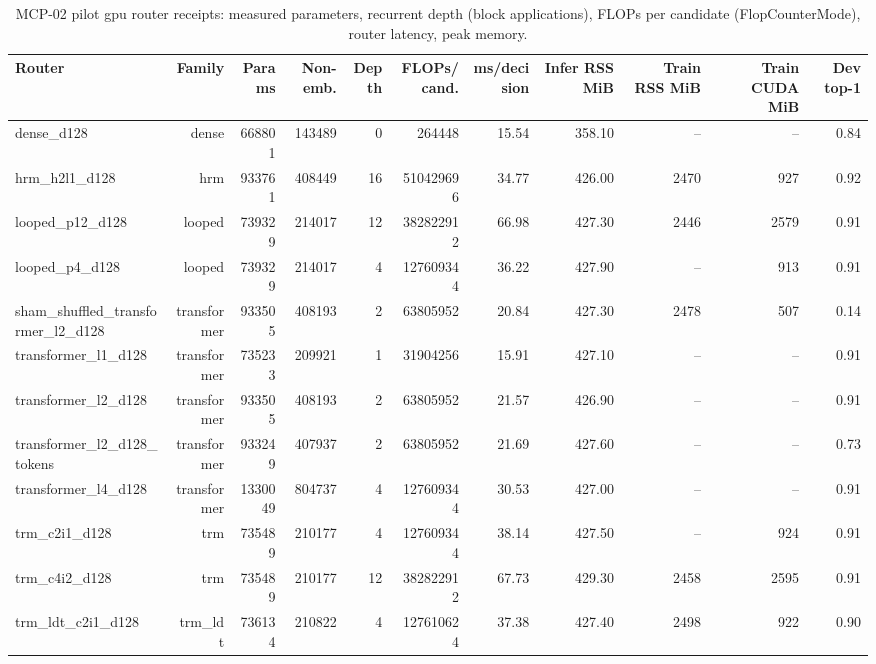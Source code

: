 \begin{table}[t]
\centering
\small
\begin{adjustbox}{max width=\linewidth}
\begin{tabular}{lrrrrrrrrrr}
\toprule
Router & Family & Params & Non-emb. & Depth & FLOPs/cand. & ms/decision & Infer RSS MiB & Train RSS MiB & Train CUDA MiB & Dev top-1 \\
\midrule
dense\_d128 & dense & 668801 & 143489 & 0 & 264448 & 15.54 & 358.10 & -- & -- & 0.84 \\
hrm\_h2l1\_d128 & hrm & 933761 & 408449 & 16 & 510429696 & 34.77 & 426.00 & 2470 & 927 & 0.92 \\
looped\_p12\_d128 & looped & 739329 & 214017 & 12 & 382822912 & 66.98 & 427.30 & 2446 & 2579 & 0.91 \\
looped\_p4\_d128 & looped & 739329 & 214017 & 4 & 127609344 & 36.22 & 427.90 & -- & 913 & 0.91 \\
sham\_shuffled\_transformer\_l2\_d128 & transformer & 933505 & 408193 & 2 & 63805952 & 20.84 & 427.30 & 2478 & 507 & 0.14 \\
transformer\_l1\_d128 & transformer & 735233 & 209921 & 1 & 31904256 & 15.91 & 427.10 & -- & -- & 0.91 \\
transformer\_l2\_d128 & transformer & 933505 & 408193 & 2 & 63805952 & 21.57 & 426.90 & -- & -- & 0.91 \\
transformer\_l2\_d128\_tokens & transformer & 933249 & 407937 & 2 & 63805952 & 21.69 & 427.60 & -- & -- & 0.73 \\
transformer\_l4\_d128 & transformer & 1330049 & 804737 & 4 & 127609344 & 30.53 & 427.00 & -- & -- & 0.91 \\
trm\_c2i1\_d128 & trm & 735489 & 210177 & 4 & 127609344 & 38.14 & 427.50 & -- & 924 & 0.91 \\
trm\_c4i2\_d128 & trm & 735489 & 210177 & 12 & 382822912 & 67.73 & 429.30 & 2458 & 2595 & 0.91 \\
trm\_ldt\_c2i1\_d128 & trm\_ldt & 736134 & 210822 & 4 & 127610624 & 37.38 & 427.40 & 2498 & 922 & 0.90 \\
\bottomrule
\end{tabular}
\end{adjustbox}
\caption{MCP-02 pilot gpu router receipts: measured parameters, recurrent depth (block applications), FLOPs per candidate (FlopCounterMode), router latency, peak memory.}
\label{tab:mcp02-pilot_gpu-receipts}
\end{table}
